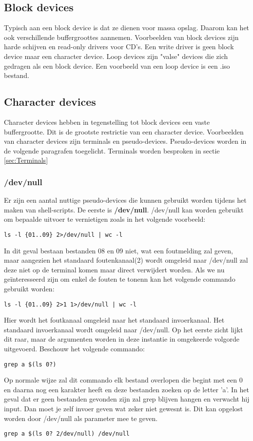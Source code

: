 \documentclass{report}
\begin{document}
\subsection{Block devices}
Typisch aan een block device is dat ze dienen voor massa opslag. Daarom kan het ook verschillende buffergroottes aannemen. Voorbeelden van block devices zijn harde schijven en read-only drivers voor CD's. Een write driver is geen block device maar een character device. Loop devices zijn "valse" devices die zich gedragen als een block device. Een voorbeeld van een loop device is een .iso bestand.

\subsection{Character devices}
Character devices hebben in tegenstelling tot block devices een vaste buffergrootte. Dit is de grootste restrictie van een character device. Voorbeelden van character devices zijn terminals en pseudo-devices. Pseudo-devices worden in de volgende paragrafen toegelicht. Terminals worden besproken in sectie \ref{sec:Terminals}

\subsubsection{/dev/null}
Er zijn een aantal nuttige pseudo-devices die kunnen gebruikt worden tijdens het maken van shell-scripts. De eerste is \textbf{/dev/null}. /dev/null kan worden gebruikt om bepaalde uitvoer te vernietigen zoals in het volgende voorbeeld:
\begin{lstlisting}
ls -l {01..09} 2>/dev/null | wc -l
\end{lstlisting}
In dit geval bestaan bestanden 08 en 09 niet, wat een foutmelding zal geven, maar aangezien het standaard foutenkanaal(2) wordt omgeleid naar /dev/null zal deze niet op de terminal komen maar direct verwijdert worden. Als we nu geïnteresseerd zijn om enkel de fouten te tonenn kan het volgende commando gebruikt worden:
\begin{lstlisting}
ls -l {01..09} 2>1 1>/dev/null | wc -l 
\end{lstlisting}
Hier wordt het foutkanaal omgeleid naar het standaard invoerkanaal. Het standaard invoerkanaal wordt omgeleid naar /dev/null. Op het eerste zicht lijkt dit raar, maar de argumenten worden in deze instantie in omgekeerde volgorde uitgevoerd.
\newline
Beschouw het volgende commando:
\begin{lstlisting}
grep a $(ls 0?)
\end{lstlisting}
Op normale wijze zal dit commando elk bestand overlopen die begint met een 0 en daarna nog een karakter heeft en deze bestanden zoeken op de letter 'a'. In het geval dat er geen bestanden gevonden zijn zal grep blijven hangen en verwacht hij input. Dan moet je zelf invoer geven wat zeker niet gewesnt is. Dit kan opgelost worden door /dev/null als parameter mee te geven.
\begin{lstlisting}
grep a $(ls 0? 2/dev/null) /dev/null
\end{lstlisting}
\end{document}
